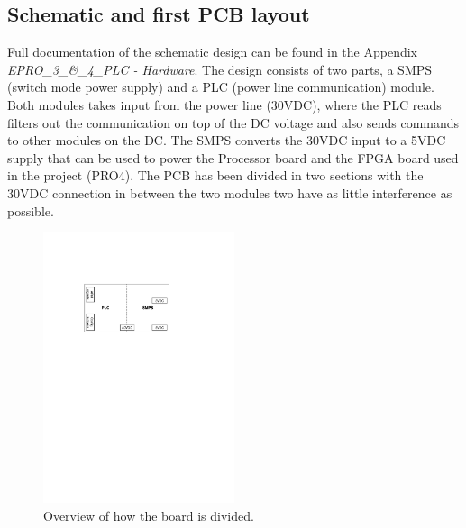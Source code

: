 \subsection{Schematic and first PCB layout}
Full documentation of the schematic design can be found in the Appendix \textit{EPRO\_3\_\&\_4\_PLC - Hardware}. The design consists of two parts, a SMPS (switch mode power supply) and a PLC (power line communication) module. Both modules takes input from the power line (30VDC), where the PLC reads filters out the communication on top of the DC voltage and also sends commands to other modules on the DC. The SMPS converts the 30VDC input to a 5VDC supply that can be used to power the Processor board and the FPGA board used in the project (PRO4). The PCB has been divided in two sections with the 30VDC connection in between the two modules two have as little interference as possible.
\begin{figure}[H]
	\begin{centering}
		 \includegraphics[width=0.5\textwidth]{images/pcb_design.pdf}
		\caption{Overview of how the board is divided.}
	\end{centering}
\end{figure}

